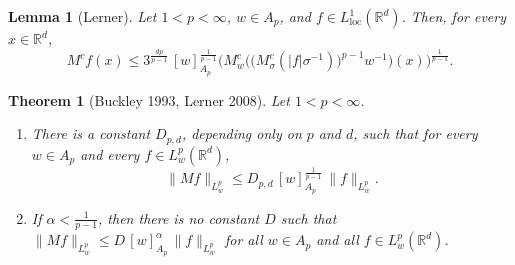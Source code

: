 \documentclass[12pt]{article}
\newtheorem{theorem}{Theorem}
\newtheorem{lemma}{Lemma}
\begin{document}
\setcounter{lemma}{6}
\begin{lemma}[Lerner]
Let $1 < p < \infty$, $w \in A_p$, and $f \in L^1_{\mathrm{loc}}(\mathbb{R}^d)$. Then, for every $x \in \mathbb{R}^d$,
\[
  M^c f(x) \le 3^{\frac{dp}{p-1}}\, [w]_{A_p}^{\frac{1}{p-1}} \Big( M^c_w\Big( \big(M^c_\sigma(|f|\sigma^{-1})\big)^{p-1} w^{-1} \Big)(x) \Big)^{\frac{1}{p-1}} .
\]
\end{lemma}

\setcounter{theorem}{1}
\begin{theorem}[Buckley 1993, Lerner 2008]
Let $1 < p < \infty$.
\begin{enumerate}[label=(\roman*)]
  \item There is a constant $D_{p,d}$, depending only on $p$ and $d$, such that for every $w \in A_p$ and every $f \in L^p_w(\mathbb{R}^d)$,
  \[
    \|Mf\|_{L^p_w} \le D_{p,d}\, [w]_{A_p}^{\frac{1}{p-1}}\, \|f\|_{L^p_w} .
  \]
  \item If $\alpha < \frac{1}{p-1}$, then there is no constant $D$ such that $\|Mf\|_{L^p_w} \le D\, [w]_{A_p}^{\alpha}\, \|f\|_{L^p_w}$ for all $w \in A_p$ and all $f \in L^p_w(\mathbb{R}^d)$.
\end{enumerate}
\end{theorem}
\end{document}
